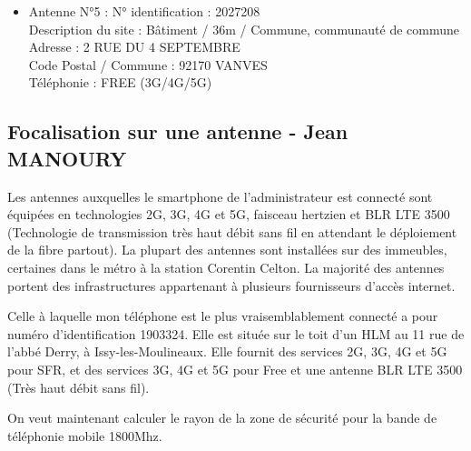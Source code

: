 \documentclass[12]{article}
\begin{document}
\begin{itemize}
Description du site : Immeuble / 37m / Société HLM \\

Adresse : 13 B R AUGUSTE GERVAIS \\

Code Postal / Commune : 92130 ISSY LES MOULINEAUX \\

Téléphonie : ORANGE (2G/3G/4G/5G) \\

    \item [$\bullet$] Antenne N°5 : N° identification : 2027208 \\
    
Description du site : Bâtiment / 36m / Commune, communauté de commune \\

Adresse : 2 RUE DU 4 SEPTEMBRE \\

Code Postal / Commune : 92170 VANVES \\

Téléphonie : FREE (3G/4G/5G) \\


\end{itemize}

\subsection{Focalisation sur une antenne - Jean MANOURY}


Les antennes auxquelles le smartphone de l'administrateur est connecté sont équipées en technologies 2G, 3G, 4G et 5G, faisceau hertzien et BLR LTE 3500 (Technologie de transmission très haut débit sans fil en attendant le déploiement de la fibre partout).
La plupart des antennes sont installées sur des immeubles, certaines dans le métro à la station Corentin Celton. La majorité des antennes portent des infrastructures appartenant à plusieurs fournisseurs d'accès internet. 

Celle à laquelle mon téléphone est le plus vraisemblablement connecté a pour numéro d'identification 1903324. Elle est située sur le toit d'un HLM au 11 rue de l'abbé Derry, à Issy-les-Moulineaux. Elle fournit des services 2G, 3G, 4G et 5G pour SFR, et des services 3G, 4G et 5G pour Free et une antenne BLR LTE 3500 (Très haut débit sans fil).


On veut maintenant calculer le rayon de la zone de sécurité pour la bande de téléphonie mobile 1800Mhz.
\end{document}
